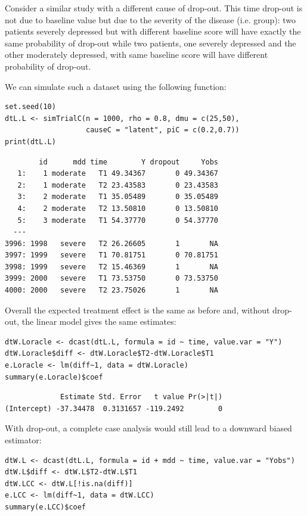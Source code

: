 \documentclass[12pt]{article}
\begin{document}
Consider a similar study with a different cause of drop-out. This time
drop-out is not due to baseline value but due to the severity of the
disease (i.e. group): two patients severely depressed but with
different baseline score will have exactly the same probability of
drop-out while two patients, one severely depressed and the other
moderately depressed, with same baseline score will have different
probability of drop-out.

\bigskip

We can simulate such a dataset using the following function:
\lstset{language=r,label= ,caption= ,captionpos=b,numbers=none}
\begin{lstlisting}
set.seed(10)
dtL.L <- simTrialC(n = 1000, rho = 0.8, dmu = c(25,50),
                   causeC = "latent", piC = c(0.2,0.7))
print(dtL.L)
\end{lstlisting}

\begin{verbatim}
        id      mdd time        Y dropout     Yobs
   1:    1 moderate   T1 49.34367       0 49.34367
   2:    1 moderate   T2 23.43583       0 23.43583
   3:    2 moderate   T1 35.05489       0 35.05489
   4:    2 moderate   T2 13.50810       0 13.50810
   5:    3 moderate   T1 54.37770       0 54.37770
  ---                                             
3996: 1998   severe   T2 26.26605       1       NA
3997: 1999   severe   T1 70.81751       0 70.81751
3998: 1999   severe   T2 15.46369       1       NA
3999: 2000   severe   T1 73.53750       0 73.53750
4000: 2000   severe   T2 23.75026       1       NA
\end{verbatim}

Overall the expected treatment effect is the same as before and,
without drop-out, the linear model gives the same estimates:
\lstset{language=r,label= ,caption= ,captionpos=b,numbers=none}
\begin{lstlisting}
dtW.Loracle <- dcast(dtL.L, formula = id ~ time, value.var = "Y")
dtW.Loracle$diff <- dtW.Loracle$T2-dtW.Loracle$T1
e.Loracle <- lm(diff~1, data = dtW.Loracle)
summary(e.Loracle)$coef
\end{lstlisting}

\begin{verbatim}
             Estimate Std. Error   t value Pr(>|t|)
(Intercept) -37.34478  0.3131657 -119.2492        0
\end{verbatim}


\clearpage

With drop-out, a complete case analysis would still lead to a downward
biased estimator:
\lstset{language=r,label= ,caption= ,captionpos=b,numbers=none}
\begin{lstlisting}
dtW.L <- dcast(dtL.L, formula = id + mdd ~ time, value.var = "Yobs")
dtW.L$diff <- dtW.L$T2-dtW.L$T1
dtW.LCC <- dtW.L[!is.na(diff)]
e.LCC <- lm(diff~1, data = dtW.LCC)
summary(e.LCC)$coef
\end{lstlisting}
\end{document}
